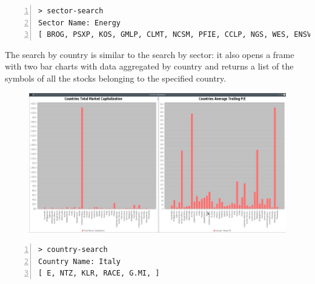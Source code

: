 \vspace{-0.5cm}
\begin{lstlisting}[basicstyle=\footnotesize\ttfamily,language={},numbers=left,keepspaces=true,tabsize=4,
numberstyle=\footnotesize,numbersep=8pt,frame=single]
> sector-search
Sector Name: Energy
[ BROG, PSXP, KOS, GMLP, CLMT, NCSM, PFIE, CCLP, NGS, WES, ENSV, FTSI, AXAS, EC, DEN, TTI, NBLX, E, GTE, PSX, PED, NNA, VVV, PVL, AR, HP, CEQP, MUR, DK, RTLR, LEU, NGL, NFG, PTEN, MMLP, PAGP, NESR, NR, PBFX, TRMD, BKR, NOG, ... ]
\end{lstlisting}
\vspace{-0.5cm}
The search by country is similar to the search by sector: it also opens a frame
with two bar charts with data aggregated by country and returns a list of the
symbols of all the stocks belonging to the specified country.
\begin{figure}[H]
	\begin{center}
		\includegraphics[scale=0.22]{img/user_manual/countries_aggregation.png}
	\end{center}
\end{figure}
\vspace{-0.6cm}
\begin{lstlisting}[basicstyle=\footnotesize\ttfamily,language={},numbers=left,keepspaces=true,tabsize=4,
numberstyle=\footnotesize,numbersep=8pt,frame=single]
> country-search
Country Name: Italy
[ E, NTZ, KLR, RACE, G.MI, ]
\end{lstlisting}
